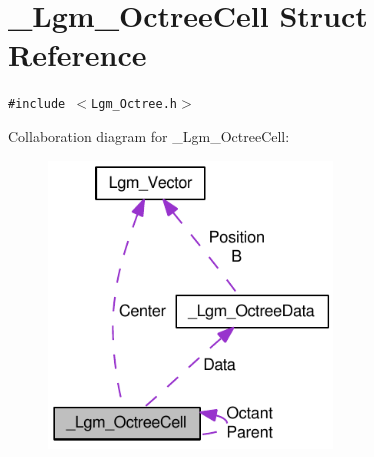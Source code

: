 \hypertarget{struct___lgm___octree_cell}{
\section{\_\-Lgm\_\-OctreeCell Struct Reference}
\label{struct___lgm___octree_cell}
}
{\tt \#include $<$Lgm\_\-Octree.h$>$}

Collaboration diagram for \_\-Lgm\_\-OctreeCell:\nopagebreak
\begin{figure}[H]
\begin{center}
\leavevmode
\includegraphics[width=214pt]{struct___lgm___octree_cell__coll__graph}
\end{center}
\end{figure}
